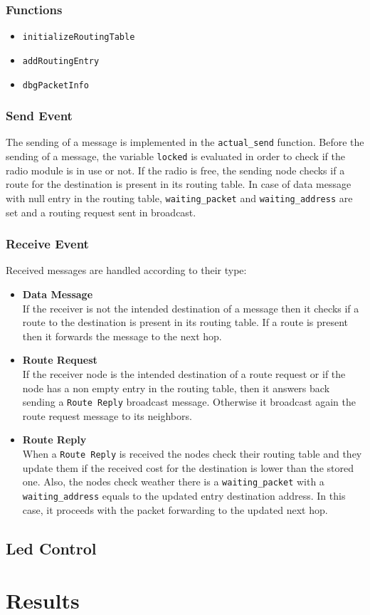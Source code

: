 \documentclass[11pt]{article}
\begin{document}
\subsubsection*{Functions}
\begin{itemize}
	\item{\texttt{initializeRoutingTable}}
	\item{\texttt{addRoutingEntry}}
	\item{\texttt{dbgPacketInfo}}
\end{itemize}

\subsubsection*{Send Event}
The sending of a message is implemented in the 	\texttt{actual\_send} function.
Before the sending of a message, the variable \texttt{locked} is evaluated in order to check if the radio module is in use or not.
If the radio is free, the sending node checks if a route for the destination is present in its routing table.
In case of data message with null entry in the routing table, \texttt{waiting\_packet} and \texttt{waiting\_address} are set and a routing request sent in broadcast.
\subsubsection*{Receive Event}
Received messages are handled according to their type:
\begin{itemize}
	\item{\textbf{Data Message}}\\
		If the receiver is not the intended destination of a message then it checks if a route to the destination is present in its routing table. If a route is present then it forwards the message to the next hop.
	\item{\textbf{Route Request}}\\
		If the receiver node is the intended destination of a route request or if the node has a non empty entry in the routing table, then it answers back sending a \texttt{Route Reply} broadcast message.
		Otherwise it broadcast again the route request message to its neighbors.
		
	\item{\textbf{Route Reply}}\\
		When a \texttt{Route Reply} is received the nodes check their routing table and they update them if the received cost for the destination is lower than the stored one.
		Also, the nodes check weather there is a \texttt{waiting\_packet} with a \texttt{waiting\_address} equals to the updated entry destination address.
		In this case, it proceeds with the packet forwarding to the updated next hop.
\end{itemize}
\subsection*{Led Control}
\section*{Results}
\end{document}
